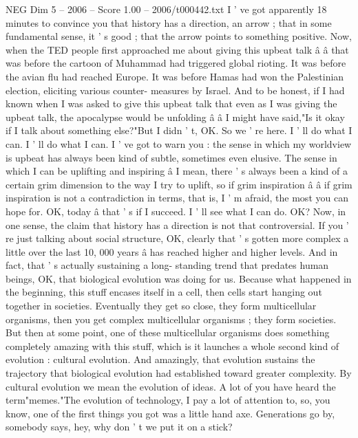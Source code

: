 \begin{textsample}{NEG Dim 5 – 2006 – Score 1.00 – 2006/t000442.txt}  \label{ex:f5_neg_062}
I ' ve got apparently 18 minutes to convince you that history has a direction, an arrow ; that in some fundamental sense, it ' s good ; that the arrow points to something positive.
Now, when the TED people first approached me about giving this upbeat talk â â that was before the cartoon of Muhammad had triggered global rioting.
It was before the avian flu had reached Europe.
It was before Hamas had won the Palestinian election, eliciting various counter- measures by Israel.
And to be honest, if I had known when I was asked to give this upbeat talk that even as I was giving the upbeat talk, the apocalypse would be unfolding â â I might have said,"Is it okay if I talk about something else?"But I didn ' t, OK.
So we ' re here.
I ' ll do what I can.
I ' ll do what I can.
I ' ve got to warn you : the sense in which my worldview is upbeat has always been kind of subtle, sometimes even elusive.
The sense in which I can be uplifting and inspiring â I mean, there ' s always been a kind of a certain grim dimension to the way I try to uplift, so if grim inspiration â â if grim inspiration is not a contradiction in terms, that is, I ' m afraid, the most you can hope for.
OK, today â that ' s if I succeed.
I ' ll see what I can do.
OK?
Now, in one sense, the claim that history has a direction is not that controversial.
If you ' re just talking about social structure, OK, clearly that ' s gotten more complex a little over the last 10, 000 years â has reached higher and higher levels.
And in fact, that ' s actually sustaining a long- standing trend that predates human beings, OK, that biological evolution was doing for us.
Because what happened in the beginning, this stuff encases itself in a cell, then cells start hanging out together in societies.
Eventually they get so close, they form multicellular organisms, then you get complex multicellular organisms ; they form societies.
But then at some point, one of these multicellular organisms does something completely amazing with this stuff, which is it launches a whole second kind of evolution : cultural evolution.
And amazingly, that evolution sustains the trajectory that biological evolution had established toward greater complexity.
By cultural evolution we mean the evolution of ideas.
A lot of you have heard the term"memes."The evolution of technology, I pay a lot of attention to, so, you know, one of the first things you got was a little hand axe.
Generations go by, somebody says, hey, why don ' t we put it on a stick?

\end{textsample}
